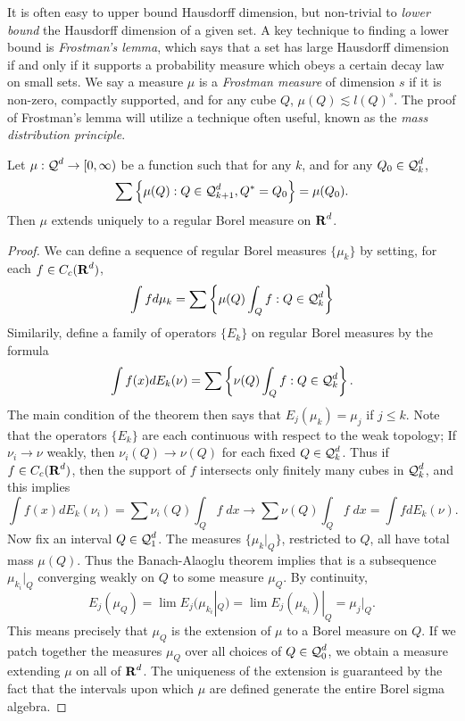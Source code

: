 It is often easy to upper bound Hausdorff dimension, but non-trivial to \emph{lower bound} the Hausdorff dimension of a given set. A key technique to finding a lower bound is \emph{Frostman's lemma}, which says that a set has large Hausdorff dimension if and only if it supports a probability measure which obeys a certain decay law on small sets. We say a measure $\mu$ is a \emph{Frostman measure} of dimension $s$ if it is non-zero, compactly supported, and for any cube $Q$, $\mu(Q) \lesssim l(Q)^s$. The proof of Frostman's lemma will utilize a technique often useful, known as the \emph{mass distribution principle}.

\begin{lemma}
	Let $\mu: \operatorname{\mathcal{Q}}^d \to [0,\infty)$ be a function such that for any $k$, and for any $Q_0 \in \operatorname{\mathcal{Q}}^d_k$,
	\[ \sum \left\{ \mu(Q) : Q \in \operatorname{\mathcal{Q}}^d_{k+1}, Q^* = Q_0 \right\} = \mu(Q_0). \]
	Then $\mu$ extends uniquely to a regular Borel measure on $\operatorname{\mathbf{R}}^d$.
\end{lemma}
\begin{proof}
	We can define a sequence of regular Borel measures $\{ \mu_k \}$ by setting, for each $f \in C_c(\operatorname{\mathbf{R}}^d)$,
	\[ \int f d\mu_k = \sum \left\{ \mu(Q) \int_Q f : Q \in \operatorname{\mathcal{Q}}_k^d \right\} \]
	Similarily, define a family of operators $\{ E_k \}$ on regular Borel measures by the formula
	\[ \int f(x) dE_k(\nu) = \sum \left\{ \nu(Q) \int_Q f : Q \in \operatorname{\mathcal{Q}}_k^d \right\}. \]
	The main condition of the theorem then says that $E_j(\mu_k) = \mu_j$ if $j \leq k$. Note that the operators $\{ E_k \}$ are each continuous with respect to the weak topology; If $\nu_i \to \nu$ weakly, then $\nu_i(Q) \to \nu(Q)$ for each fixed $Q \in \operatorname{\mathcal{Q}}_k^d$. Thus if $f \in C_c(\operatorname{\mathbf{R}}^d)$, then the support of $f$ intersects only finitely many cubes in $\operatorname{\mathcal{Q}}_k^d$, and this implies
	\[ \int f(x) dE_k(\nu_i) = \sum \nu_i(Q) \int_Q f\; dx \to \sum \nu(Q) \int_Q f\; dx = \int f dE_k(\nu). \]
	Now fix an interval $Q \in \operatorname{\mathcal{Q}}_1^d$. The measures $\{ \mu_k|_Q \}$, restricted to $Q$, all have total mass $\mu(Q)$. Thus the Banach-Alaoglu theorem implies that is a subsequence $\mu_{k_i}|_Q$ converging weakly on $Q$ to some measure $\mu_Q$. By continuity,
	\[ E_j(\mu_Q) = \lim E_j(\mu_{k_i}|_Q) = \lim E_j(\mu_{k_i})|_Q = \mu_j|_Q. \]
	This means precisely that $\mu_Q$ is the extension of $\mu$ to a Borel measure on $Q$. If we patch together the measures $\mu_Q$ over all choices of $Q \in \operatorname{\mathcal{Q}}_0^d$, we obtain a measure extending $\mu$ on all of $\operatorname{\mathbf{R}}^d$. The uniqueness of the extension is guaranteed by the fact that the intervals upon which $\mu$ are defined generate the entire Borel sigma algebra.
\end{proof}

